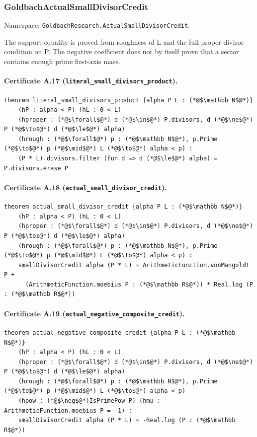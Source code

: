 \documentclass[11pt,a4paper]{article}
\theoremstyle{definition}
\theoremstyle{remark}
\begin{document}
\subsubsection{GoldbachActualSmallDivisorCredit}
Namespace: \nolinkurl{GoldbachResearch.ActualSmallDivisorCredit}.

The support equality is proved from roughness of L and the full proper-divisor condition on P. The negative coefficient does not by itself prove that a sector contains enough prime first-axis mass.

\paragraph{Certificate A.17 (\texttt{literal\_small\_divisors\_product}).}
\begin{lstlisting}
theorem literal_small_divisors_product {alpha P L : (*@$\mathbb N$@*)}
    (hP : alpha < P) (hL : 0 < L)
    (hproper : (*@$\forall$@*) d (*@$\in$@*) P.divisors, d (*@$\ne$@*) P (*@$\to$@*) d (*@$\le$@*) alpha)
    (hrough : (*@$\forall$@*) p : (*@$\mathbb N$@*), p.Prime (*@$\to$@*) p (*@$\mid$@*) L (*@$\to$@*) alpha < p) :
    (P * L).divisors.filter (fun d => d (*@$\le$@*) alpha) = P.divisors.erase P
\end{lstlisting}

\paragraph{Certificate A.18 (\texttt{actual\_small\_divisor\_credit}).}
\begin{lstlisting}
theorem actual_small_divisor_credit {alpha P L : (*@$\mathbb N$@*)}
    (hP : alpha < P) (hL : 0 < L)
    (hproper : (*@$\forall$@*) d (*@$\in$@*) P.divisors, d (*@$\ne$@*) P (*@$\to$@*) d (*@$\le$@*) alpha)
    (hrough : (*@$\forall$@*) p : (*@$\mathbb N$@*), p.Prime (*@$\to$@*) p (*@$\mid$@*) L (*@$\to$@*) alpha < p) :
    smallDivisorCredit alpha (P * L) = ArithmeticFunction.vonMangoldt P +
      (ArithmeticFunction.moebius P : (*@$\mathbb R$@*)) * Real.log (P : (*@$\mathbb R$@*))
\end{lstlisting}

\paragraph{Certificate A.19 (\texttt{actual\_negative\_composite\_credit}).}
\begin{lstlisting}
theorem actual_negative_composite_credit {alpha P L : (*@$\mathbb N$@*)}
    (hP : alpha < P) (hL : 0 < L)
    (hproper : (*@$\forall$@*) d (*@$\in$@*) P.divisors, d (*@$\ne$@*) P (*@$\to$@*) d (*@$\le$@*) alpha)
    (hrough : (*@$\forall$@*) p : (*@$\mathbb N$@*), p.Prime (*@$\to$@*) p (*@$\mid$@*) L (*@$\to$@*) alpha < p)
    (hpow : (*@$\neg$@*)IsPrimePow P) (hmu : ArithmeticFunction.moebius P = -1) :
    smallDivisorCredit alpha (P * L) = -Real.log (P : (*@$\mathbb R$@*))
\end{lstlisting}
\end{document}
